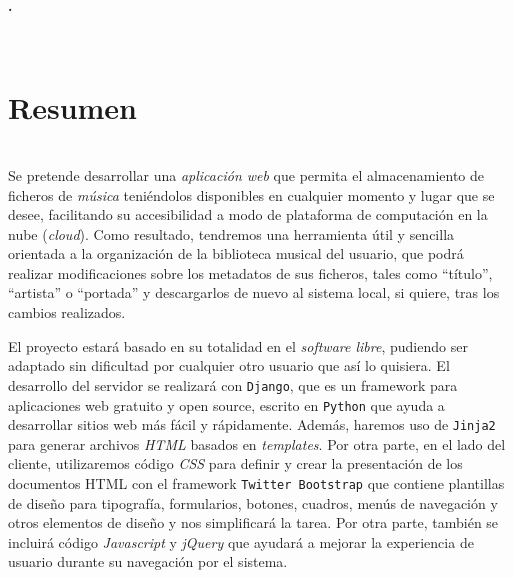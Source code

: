 

\begin{center}
{\large\bfseries \myTitle. \mySubTitle}\\
\end{center}
\begin{center}
\myName\\
\end{center}

\section*{Resumen}

\bigskip
{}\\

Se pretende desarrollar una \textit{aplicación web} que permita el almacenamiento de ficheros de \textit{música} teniéndolos disponibles en cualquier momento y lugar que se desee, facilitando su accesibilidad a modo de plataforma de computación en la nube (\textit{cloud}). Como resultado, tendremos una herramienta útil y sencilla orientada a la organización de la biblioteca musical del usuario, que podrá realizar modificaciones sobre los metadatos de sus ficheros, tales como ``título'', ``artista'' o ``portada'' y descargarlos de nuevo al sistema local, si quiere, tras los cambios realizados.

El proyecto estará basado en su totalidad en el \textit{software libre}, pudiendo ser adaptado sin dificultad por cualquier otro usuario que así lo quisiera. El desarrollo del servidor se realizará con {\tt Django}, que es un framework para aplicaciones web gratuito y open source, escrito en {\tt Python} que ayuda a desarrollar sitios web más fácil y rápidamente. Además, haremos uso de {\tt Jinja2} para generar archivos \textit{HTML} basados en \textit{templates}. Por otra parte, en el lado del cliente, utilizaremos código \textit{CSS} para definir y crear la presentación de los documentos HTML con el framework {\tt Twitter Bootstrap} que contiene plantillas de diseño para tipografía, formularios, botones, cuadros, menús de navegación y otros elementos de diseño y nos simplificará la tarea. Por otra parte, también se incluirá código \textit{Javascript} y \textit{jQuery} que ayudará a mejorar la experiencia de usuario durante su navegación por el sistema.

